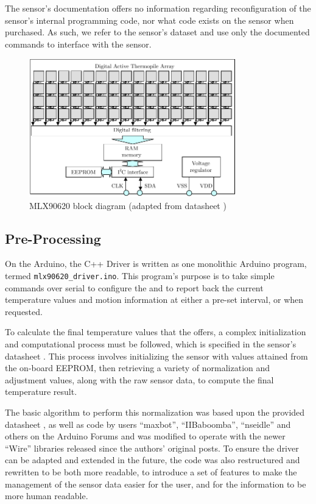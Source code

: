 \documentclass[../thesis/thesis.tex]{subfiles}
\begin{document}
The sensor's documentation offers no information regarding reconfiguration of the sensor's internal programming code, nor what code exists on the sensor when purchased. As such, we refer to the sensor's dataset \cite{MLXDatasheet} and use only the documented commands to interface with the sensor.

\begin{figure}
\centering
\includegraphics[width=0.8\textwidth]{../diagrams/mlx-block-diagram.pdf}
\caption{MLX90620 block diagram (adapted from datasheet \cite{MLXDatasheet})}
\label{fig:exps:blockdia}
\end{figure}

\subsection{Pre-Processing}

On the Arduino, the \tarl C++ Driver is written as one monolithic Arduino program, termed \texttt{mlx90620\_driver.ino}. This program's purpose is to take simple commands over serial to configure the \mlx and to report back the current temperature values and \pir motion information at either a pre-set interval, or when requested.

To calculate the final temperature values that the \mlx offers, a complex initialization and computational process must be followed, which is specified in the sensor's datasheet \cite{MLXDatasheet}. This process involves initializing the sensor with values attained from the on-board EEPROM, then retrieving a variety of normalization and adjustment values, along with the raw sensor data, to compute the final temperature result.

The basic algorithm to perform this normalization was based upon the provided datasheet \cite{MLXDatasheet}, as well as code by users ``maxbot'', ``IIBaboomba'', ``nseidle'' and others on the Arduino Forums \cite{ArduinoForum} and was modified to operate with the newer \ard ``Wire'' \iic libraries released since the authors' original posts. To ensure the driver can be adapted and extended in the future, the code was also restructured and rewritten to be both more readable, to introduce a set of features to make the management of the sensor data easier for the user, and for the information to be more human readable.
\end{document}
